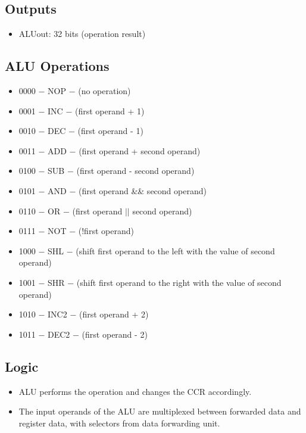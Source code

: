 \subsection{Outputs}
\begin{itemize}
    \item ALUout: 32 bits (operation result)
\end{itemize}

\subsection{ALU Operations}
\begin{itemize}
    \item 0000 $-$ NOP $-$ (no operation)
    \item 0001 $-$ INC $-$ (first operand + 1)
    \item 0010 $-$ DEC $-$ (first operand - 1)
    \item 0011 $-$ ADD $-$ (first operand + second operand)
    \item 0100 $-$ SUB $-$ (first operand - second operand)
    \item 0101 $-$ AND $-$ (first operand \&\& second operand)
    \item 0110 $-$ OR $-$ (first operand $||$ second operand)
    \item 0111 $-$ NOT $-$ (!first operand)
    \item 1000 $-$ SHL $-$ (shift first operand to the left with the value of second operand)
    \item 1001 $-$ SHR $-$ (shift first operand to the right with the value of second operand)
    \item 1010 $-$ INC2 $-$ (first operand + 2)
    \item 1011 $-$ DEC2 $-$ (first operand - 2)
\end{itemize}

\subsection{Logic}
\begin{itemize}
    \item ALU performs the operation and changes the CCR accordingly.
    \item The input operands of the ALU are multiplexed between forwarded data and register data, with selectors from data forwarding unit.
\end{itemize}

